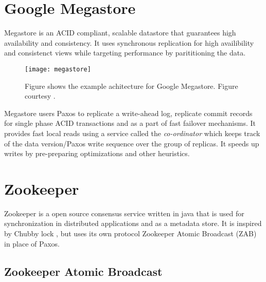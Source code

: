 \section{Google Megastore}

Megastore \citep{BakerBCFKLLLLY11} is an ACID%
compliant, scalable datastore that guarantees high availability and
consistency. It uses synchronous replication for high availibility and
consistenct views while targeting performance by parititioning the data.

\begin{figure}
  \texttt{[image: megastore]}
  \caption[Google Megastore]{%
    Figure shows the example achitecture for Google Megastore.
    Figure courtesy \citet{BakerBCFKLLLLY11}.}
  \label{figure:megastore}
\end{figure}

Megastore users Paxos to replicate a write-ahead log, replicate commit
records for single phase ACID transactions and as a part of fast failover
mechanisms. It provides fast local reads using a service called the
\emph{co-ordinator} which keeps track of the data version/Paxos write
sequence over the group of replicas. It speeds up writes by pre-preparing
optimizations and other heuristics.

\section{Zookeeper}
\label{section:zookeeper}

Zookeeper \citep{Hunt:2010:ZWC:1855840.1855851, zookeeper} is a open source 
consensus service written in java that is used for synchronization in 
distributed applications and as a metadata store. It is inspired by Chubby lock 
, but uses its own protocol Zookeeper Atomic Broadcast 
(ZAB) in place of Paxos.

\subsection{Zookeeper Atomic Broadcast}

